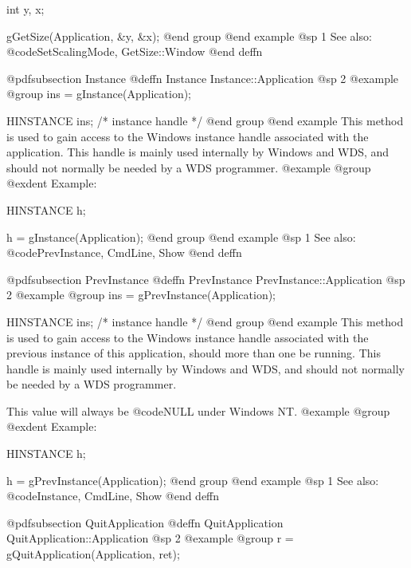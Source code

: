 int     y, x;

gGetSize(Application, &y, &x);
@end group
@end example
@sp 1
See also:  @code{SetScalingMode, GetSize::Window}
@end deffn













@pdfsubsection {Instance}
@deffn {Instance} Instance::Application
@sp 2
@example
@group
ins = gInstance(Application);

HINSTANCE  ins;    /*  instance handle   */
@end group
@end example
This method is used to gain access to the Windows instance handle
associated with the application.  This handle is mainly used internally
by Windows and WDS, and should not normally be needed by a WDS
programmer.
@example
@group
@exdent Example:

HINSTANCE  h;

h = gInstance(Application);
@end group
@end example
@sp 1
See also:  @code{PrevInstance, CmdLine, Show}
@end deffn











@pdfsubsection {PrevInstance}
@deffn {PrevInstance} PrevInstance::Application
@sp 2
@example
@group
ins = gPrevInstance(Application);

HINSTANCE  ins;    /*  instance handle   */
@end group
@end example
This method is used to gain access to the Windows instance handle
associated with the previous instance of this application, should more
than one be running.  This handle is mainly used internally by Windows
and WDS, and should not normally be needed by a WDS programmer.

This value will always be @code{NULL} under Windows NT.
@example
@group
@exdent Example:

HINSTANCE  h;

h = gPrevInstance(Application);
@end group
@end example
@sp 1
See also:  @code{Instance, CmdLine, Show}
@end deffn









@pdfsubsection {QuitApplication}
@deffn {QuitApplication} QuitApplication::Application
@sp 2
@example
@group
r = gQuitApplication(Application, ret);

